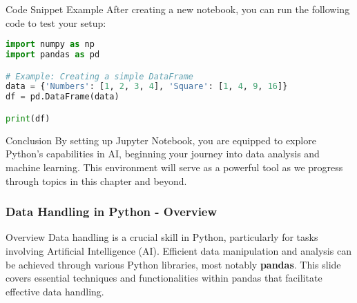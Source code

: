\documentclass[aspectratio=169]{beamer}
\begin{document}
\begin{frame}[fragile]{Code Snippet Example}
    After creating a new notebook, you can run the following code to test your setup:
    \begin{lstlisting}[language=Python]
import numpy as np
import pandas as pd

# Example: Creating a simple DataFrame
data = {'Numbers': [1, 2, 3, 4], 'Square': [1, 4, 9, 16]}
df = pd.DataFrame(data)

print(df)
    \end{lstlisting}
\end{frame}

\begin{frame}{Conclusion}
    By setting up Jupyter Notebook, you are equipped to explore Python's capabilities in AI, beginning your journey into data analysis and machine learning. This environment will serve as a powerful tool as we progress through topics in this chapter and beyond.
\end{frame}

\begin{frame}[fragile]
    \frametitle{Data Handling in Python - Overview}
    \begin{block}{Overview}
        Data handling is a crucial skill in Python, particularly for tasks involving Artificial Intelligence (AI). Efficient data manipulation and analysis can be achieved through various Python libraries, most notably \textbf{pandas}. This slide covers essential techniques and functionalities within pandas that facilitate effective data handling.
    \end{block}
\end{frame}
\end{document}
